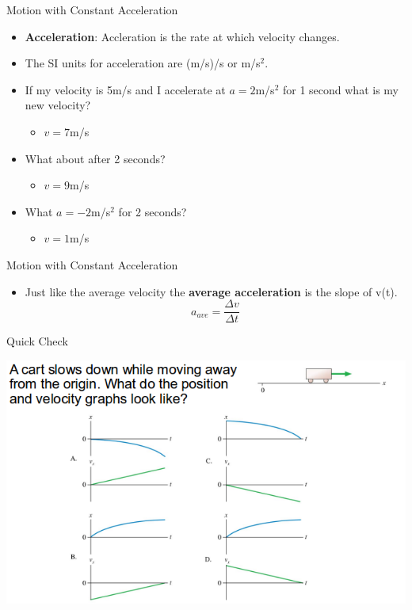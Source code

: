 \documentclass{beamer}
\newcommand{\red}[1]{{\color{red}{#1}}}
\newcommand{\checkL}[2]{\begin{textblock*}{1cm}(#1,#2){\Large \red{\Checkmark}}\end{textblock*}}
\begin{document}
\begin{frame}{Motion with Constant Acceleration}
\begin{itemize}
   \item {\bf Acceleration}: Accleration is the rate at which velocity changes.
   \item The SI units for acceleration are (m/s)/s or m/s$^2$.
   \item<2-> If my velocity is 5m/s and I accelerate at $a=2$m/s$^2$ for 1 second what is my new velocity?
   \begin{itemize} 
      \item<3-> $v=7$m/s 
   \end{itemize}
   \item<4> What about after 2 seconds?
   \begin{itemize} \item<5-> $v=9$m/s \end{itemize}
   \item<6> What $a=-2$m/s$^2$ for 2 seconds?
   \begin{itemize} \item<7-> $v=1$m/s \end{itemize}
\end{itemize}
\end{frame}

\begin{frame}{Motion with Constant Acceleration}
\begin{itemize}
   \item Just like the average velocity the {\bf average acceleration} is the slope of v(t).
   \begin{equation*}
      a_{ave} = \frac{\Delta v}{\Delta t}
   \end{equation*}
\end{itemize}
\end{frame}

\begin{frame}{Quick Check}
\begin{center}
   \includegraphics[width=\textwidth]{../figures/QC2_11.png}
\end{center}
\only<2->{\checkL{6.0cm}{6.4cm}}
\end{frame}
\end{document}
